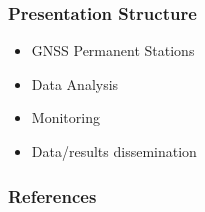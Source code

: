 \documentclass[customfont, aspectratio=169, printbib]{Classes/beamerPub}%
\begin{document}
\maketitle

\begin{frame}
  \frametitle{Presentation Structure}
  \begin{itemize}\setlength\itemsep{1em}
    \item GNSS Permanent Stations
    \item Data Analysis
    \item Monitoring
    \item Data/results dissemination
  \end{itemize}
\end{frame}






\makethanku %

\ifdefinePrintbib
  \begin{frame}[t,allowframebreaks]
    \frametitle{References}
    \printbibliography
  \end{frame}
\fi

% 


\end{document}
